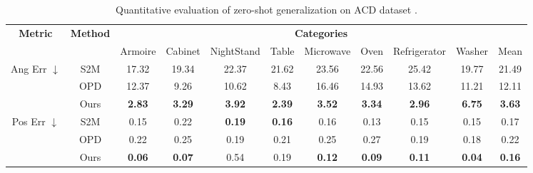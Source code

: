 \begin{table*}[t!]
\footnotesize
\centering
\caption{
Quantitative evaluation of zero-shot generalization on ACD dataset \cite{iliash2024s2o}.
}
\begin{tabular}{c|c|ccccccccc}
\hline
\multirow{2}{*}{\textbf{Metric}}                            & \multirow{2}{*}{\textbf{Method}} & \multicolumn{9}{c}{\textbf{Categories}}                                                     \\ \cline{3-11} 
                                                   &                         & Armoire & Cabinet & NightStand & Table & Microwave & Oven & Refrigerator & Washer & Mean \\ \hline
\multirow{3}{*}{Ang Err $\downarrow$}& S2M                     &      17.32   &    19.34     &       22.37     &    21.62   &    23.56       &  22.56    &    25.42    &   19.77     &    21.49  \\
                                                   & OPD                     &     12.37    &    9.26     &     10.62       &   8.43    &     16.46      &   14.93   &   13.62     &   11.21     &   12.11   \\
                                                   & Ours                    &  \cellcolor{blue!15} \textbf{2.83}      &    \cellcolor{blue!15}\textbf{3.29}     &     \cellcolor{blue!15}\textbf{3.92}       &   \cellcolor{blue!15}\textbf{2.39}    &     \cellcolor{blue!15}\textbf{3.52}      &    \cellcolor{blue!15}\textbf{3.34}  &  \cellcolor{blue!15}\textbf{2.96}      &    \cellcolor{blue!15}\textbf{6.75}    &  \cellcolor{blue!15}\textbf{3.63}    \\ \hline
\multirow{3}{*}{Pos Err $\downarrow$} & S2M                     &    0.15     &    0.22     &      \cellcolor{blue!15}  \textbf{0.19}    & \cellcolor{blue!15} \textbf{0.16}     &      0.16     &   0.13   &   0.15    &    0.15    &   0.17   \\
                                                   & OPD                     &    0.22     &     0.25    &   0.19         &   0.21    &     0.25      &   0.27   &   0.19     &   0.18     &  0.22    \\
                                                & Ours                    &  \cellcolor{blue!15} \textbf{0.06}      & \cellcolor{blue!15}  \textbf{0.07}      &     0.54       &   0.19    & \cellcolor{blue!15} \textbf{0.12}         &   \cellcolor{blue!15}\textbf{0.09}   &     \cellcolor{blue!15}\textbf{0.11}   &    \cellcolor{blue!15}\textbf{0.04}    &   \cellcolor{blue!15}\textbf{0.16}   \\ \hline
\end{tabular}
\label{tab:motion_parameter_estimation_gen}
\end{table*}

